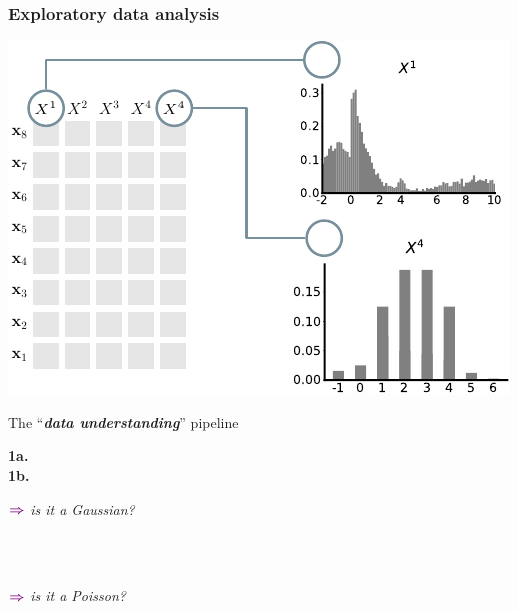 \documentclass[xcolor={usenames,dvipsnames,svgnames}, compress, aspectratio=169, 11pt]{beamer}
\newcommand{\comment}[3][\small]{\begin{minipage}{1\linewidth}
          \raggedleft
          {
            $\color{violet}\boldsymbol\Rightarrow$
            #1
            {\emph{#2}}
          }
      \end{minipage}#3\\
}
\begin{document}
\begin{frame}[t, htt=bgrey2]
  \frametitle{Exploratory data analysis}

  \large
  \begin{minipage}[t]{0.6\linewidth}
    \vspace{5pt}
    \includegraphics[width=.9\linewidth]{figures/abda-hist-type}
  \end{minipage}\hfill\begin{minipage}[t]{0.4\linewidth}
    \vspace{10pt}
    {The ``\emph{\textbf{data understanding}}'' pipeline}\\[3pt]
    \raggedleft\begin{minipage}[t]{.9\linewidth}
      {\textbf{1a.} \\[-2pt]}
      {\textbf{1b.} \\[5pt]}
    {\comment[\normalsize]{is it a Gaussian?}{}\\[-17pt]
      \comment[\normalsize]{is it a Poisson?}{}\\}
    \end{minipage}    
  \end{minipage}  
\end{frame}
\end{document}
